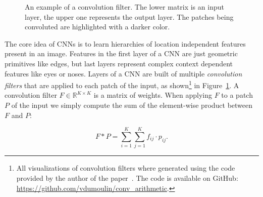 \begin{figure}[h]
\begin{subfigure}[b]{0.24\textwidth}
  \end{subfigure}  
  \caption{An example of a convolution filter. The lower matrix is an input layer, the upper one represents the output layer. The patches being convoluted are highlighted with a darker color.}
  \label{fig:conv_no_padding_no_strides}
\end{figure}

The core idea of CNNs is to learn hierarchies of location independent features present in an image. Features in the first layer of a CNN are just geometric primitives like edges, but last layers represent complex context dependent features like eyes or noses. Layers of a CNN are built of multiple \textit{convolution filters} that are applied to each patch of the input, as shown\footnote{All visualizations of convolution filters where generated using the code provided by the author of the paper~\cite{conv_tutorial}. The code is available on GitHub: \url{https://github.com/vdumoulin/conv_arithmetic}.} in Figure~\ref{fig:conv_no_padding_no_strides}. A convolution filter $F \in \mathbb{R}^{K \times K}$ is a matrix of weights. When applying $F$ to a patch $P$ of the input we simply compute the sum of the element-wise product between $F$ and $P$:

\begin{equation}
	F * P  = \sum_{i=1}^K \sum_{j=1}^K f_{ij} \cdot p_{ij}.
\end{equation}

